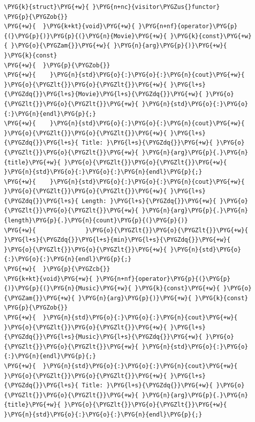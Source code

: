 \begin{itemize}
\begin{codeblockbg}
\begin{Verbatim}[commandchars=\\\{\},breaklines=true,breakanywhere=true,fontsize=\codefont,xleftmargin=17bp]
\PYG{k}{struct}\PYG{+w}{ }\PYG{n+nc}{visitor\PYGZus{}functor}
\PYG{p}{\PYGZob{}}
\PYG{+w}{  }\PYG{k+kt}{void}\PYG{+w}{ }\PYG{n+nf}{operator}\PYG{p}{(}\PYG{p}{)}\PYG{p}{(}\PYG{n}{Movie}\PYG{+w}{ }\PYG{k}{const}\PYG{+w}{ }\PYG{o}{\PYGZam{}}\PYG{+w}{ }\PYG{n}{arg}\PYG{p}{)}\PYG{+w}{ }\PYG{k}{const}
\PYG{+w}{  }\PYG{p}{\PYGZob{}}
\PYG{+w}{    }\PYG{n}{std}\PYG{o}{:}\PYG{o}{:}\PYG{n}{cout}\PYG{+w}{ }\PYG{o}{\PYGZlt{}}\PYG{o}{\PYGZlt{}}\PYG{+w}{ }\PYG{l+s}{\PYGZdq{}}\PYG{l+s}{Movie}\PYG{l+s}{\PYGZdq{}}\PYG{+w}{ }\PYG{o}{\PYGZlt{}}\PYG{o}{\PYGZlt{}}\PYG{+w}{ }\PYG{n}{std}\PYG{o}{:}\PYG{o}{:}\PYG{n}{endl}\PYG{p}{;}
\PYG{+w}{    }\PYG{n}{std}\PYG{o}{:}\PYG{o}{:}\PYG{n}{cout}\PYG{+w}{ }\PYG{o}{\PYGZlt{}}\PYG{o}{\PYGZlt{}}\PYG{+w}{ }\PYG{l+s}{\PYGZdq{}}\PYG{l+s}{ Title: }\PYG{l+s}{\PYGZdq{}}\PYG{+w}{ }\PYG{o}{\PYGZlt{}}\PYG{o}{\PYGZlt{}}\PYG{+w}{ }\PYG{n}{arg}\PYG{p}{.}\PYG{n}{title}\PYG{+w}{ }\PYG{o}{\PYGZlt{}}\PYG{o}{\PYGZlt{}}\PYG{+w}{ }\PYG{n}{std}\PYG{o}{:}\PYG{o}{:}\PYG{n}{endl}\PYG{p}{;}
\PYG{+w}{    }\PYG{n}{std}\PYG{o}{:}\PYG{o}{:}\PYG{n}{cout}\PYG{+w}{ }\PYG{o}{\PYGZlt{}}\PYG{o}{\PYGZlt{}}\PYG{+w}{ }\PYG{l+s}{\PYGZdq{}}\PYG{l+s}{ Length: }\PYG{l+s}{\PYGZdq{}}\PYG{+w}{ }\PYG{o}{\PYGZlt{}}\PYG{o}{\PYGZlt{}}\PYG{+w}{ }\PYG{n}{arg}\PYG{p}{.}\PYG{n}{length}\PYG{p}{.}\PYG{n}{count}\PYG{p}{(}\PYG{p}{)}
\PYG{+w}{              }\PYG{o}{\PYGZlt{}}\PYG{o}{\PYGZlt{}}\PYG{+w}{ }\PYG{l+s}{\PYGZdq{}}\PYG{l+s}{min}\PYG{l+s}{\PYGZdq{}}\PYG{+w}{ }\PYG{o}{\PYGZlt{}}\PYG{o}{\PYGZlt{}}\PYG{+w}{ }\PYG{n}{std}\PYG{o}{:}\PYG{o}{:}\PYG{n}{endl}\PYG{p}{;}
\PYG{+w}{  }\PYG{p}{\PYGZcb{}}
\PYG{k+kt}{void}\PYG{+w}{ }\PYG{n+nf}{operator}\PYG{p}{(}\PYG{p}{)}\PYG{p}{(}\PYG{n}{Music}\PYG{+w}{ }\PYG{k}{const}\PYG{+w}{ }\PYG{o}{\PYGZam{}}\PYG{+w}{ }\PYG{n}{arg}\PYG{p}{)}\PYG{+w}{ }\PYG{k}{const}
\PYG{p}{\PYGZob{}}
\PYG{+w}{  }\PYG{n}{std}\PYG{o}{:}\PYG{o}{:}\PYG{n}{cout}\PYG{+w}{ }\PYG{o}{\PYGZlt{}}\PYG{o}{\PYGZlt{}}\PYG{+w}{ }\PYG{l+s}{\PYGZdq{}}\PYG{l+s}{Music}\PYG{l+s}{\PYGZdq{}}\PYG{+w}{ }\PYG{o}{\PYGZlt{}}\PYG{o}{\PYGZlt{}}\PYG{+w}{ }\PYG{n}{std}\PYG{o}{:}\PYG{o}{:}\PYG{n}{endl}\PYG{p}{;}
\PYG{+w}{  }\PYG{n}{std}\PYG{o}{:}\PYG{o}{:}\PYG{n}{cout}\PYG{+w}{ }\PYG{o}{\PYGZlt{}}\PYG{o}{\PYGZlt{}}\PYG{+w}{ }\PYG{l+s}{\PYGZdq{}}\PYG{l+s}{ Title: }\PYG{l+s}{\PYGZdq{}}\PYG{+w}{ }\PYG{o}{\PYGZlt{}}\PYG{o}{\PYGZlt{}}\PYG{+w}{ }\PYG{n}{arg}\PYG{p}{.}\PYG{n}{title}\PYG{+w}{ }\PYG{o}{\PYGZlt{}}\PYG{o}{\PYGZlt{}}\PYG{+w}{ }\PYG{n}{std}\PYG{o}{:}\PYG{o}{:}\PYG{n}{endl}\PYG{p}{;}

\end{Verbatim}
\end{codeblockbg}
\end{itemize}
